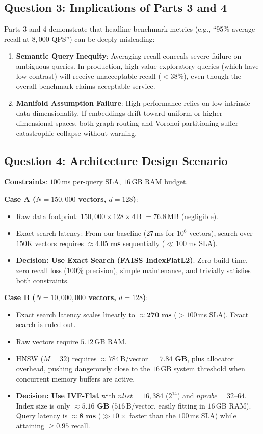 \documentclass[10pt,twocolumn,a4paper]{article}
\begin{document}
\subsection{Question 3: Implications of Parts 3 and 4}
Parts 3 and 4 demonstrate that headline benchmark metrics (e.g., ``$95\%$ average recall at $8,000$ QPS'') can be deeply misleading:
\begin{enumerate}
    \item \textbf{Semantic Query Inequity}: Averaging recall conceals severe failure on ambiguous queries. In production, high-value exploratory queries (which have low contrast) will receive unacceptable recall ($<38\%$), even though the overall benchmark claims acceptable service.
    \item \textbf{Manifold Assumption Failure}: High performance relies on low intrinsic data dimensionality. If embeddings drift toward uniform or higher-dimensional spaces, both graph routing and Voronoi partitioning suffer catastrophic collapse without warning.
\end{enumerate}

\subsection{Question 4: Architecture Design Scenario}
\textbf{Constraints}: $100$\,ms per-query SLA, $16$\,GB RAM budget.

\noindent\textbf{Case A ($N = 150,000$ vectors, $d=128$)}:
\begin{itemize}
    \item Raw data footprint: $150,000 \times 128 \times 4$\,B $= 76.8$\,MB (negligible).
    \item Exact search latency: From our baseline ($27$\,ms for $10^6$ vectors), search over $150\text{K}$ vectors requires $\approx \mathbf{4.05\text{ ms}}$ sequentially ($\ll 100$\,ms SLA).
    \item \textbf{Decision: Use Exact Search (FAISS IndexFlatL2)}. Zero build time, zero recall loss ($100\%$ precision), simple maintenance, and trivially satisfies both constraints.
\end{itemize}

\noindent\textbf{Case B ($N = 10,000,000$ vectors, $d=128$)}:
\begin{itemize}
    \item Exact search latency scales linearly to $\approx \mathbf{270\text{ ms}}$ ($> 100$\,ms SLA). Exact search is ruled out.
    \item Raw vectors require $5.12$\,GB RAM.
    \item HNSW ($M=32$) requires $\approx 784$\,B/vector $= \mathbf{7.84\text{ GB}}$, plus allocator overhead, pushing dangerously close to the $16$\,GB system threshold when concurrent memory buffers are active.
    \item \textbf{Decision: Use IVF-Flat} with $nlist = 16,384$ ($2^{14}$) and $nprobe = 32$--$64$. Index size is only $\approx \mathbf{5.16\text{ GB}}$ ($516$\,B/vector, easily fitting in $16$\,GB RAM). Query latency is $\approx \mathbf{8\text{ ms}}$ ($\gg 10\times$ faster than the $100$\,ms SLA) while attaining $\ge 0.95$ recall.
\end{itemize}
\end{document}
